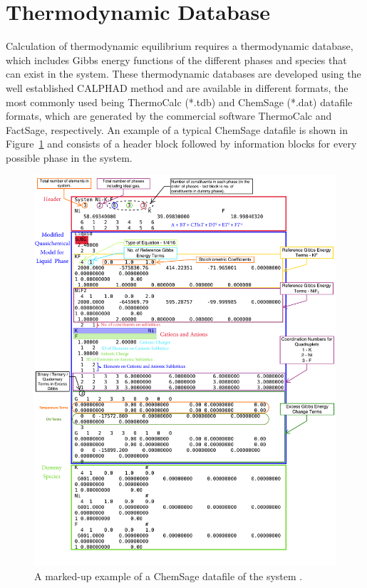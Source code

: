 \section{Thermodynamic Database}
	Calculation of thermodynamic equilibrium requires a thermodynamic database, which includes Gibbs energy functions of the different phases and species that can exist in the system. These thermodynamic databases are developed using the well established CALPHAD method \cite{Kaufman:1970aa} and are available in different formats, the most commonly used being ThermoCalc (*.tdb) and ChemSage (*.dat) datafile formats, which are generated by the commercial software ThermoCalc and FactSage, respectively. An example of a typical ChemSage datafile is shown in Figure~\ref{fig:datfile} and consists of a header block followed by information blocks for every possible phase in the system.
	\begin{figure}[htbp]
	 	\centering
	   	\includegraphics[width=\textwidth]{figures/chapter-6/NiKF.pdf}
	   	\caption[A marked-up example of a ChemSage datafile of the  system.]{A marked-up example of a ChemSage datafile of the  system \cite{OcadizFlores18}.}
	   	\label{fig:datfile}
	\end{figure}

